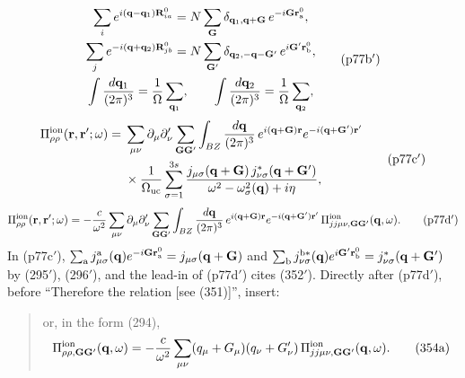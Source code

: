 \documentclass[11pt]{article}
\begin{document}
\begin{equation*}
\begin{gathered}
\sum_ie^{i(\mathbf q-\mathbf q_1)\mathbf R^0_{ia}}=N\sum_{\mathbf G}\delta_{\mathbf q_1,\mathbf q+\mathbf G}\,
e^{-i\mathbf G\mathbf r^0_{\rm a}},\\
\sum_je^{-i(\mathbf q+\mathbf q_2)\mathbf R^0_{jb}}=N\sum_{\mathbf G'}\delta_{\mathbf q_2,-\mathbf q-\mathbf G'}\,
e^{i\mathbf G'\mathbf r^0_{\rm b}},\\
\int\frac{d\mathbf q_1}{(2\pi)^3}=\frac1\Omega\sum_{\mathbf q_1},\qquad
\int\frac{d\mathbf q_2}{(2\pi)^3}=\frac1\Omega\sum_{\mathbf q_2},
\end{gathered}
\tag{p77b$'$}
\end{equation*}
\begin{equation*}
\begin{split}
\Pi^{\rm ion}_{\rho\rho}(\mathbf r,\mathbf r';\omega)={}&\sum_{\mu\nu}\partial_\mu\partial'_\nu
\sum_{\mathbf G\mathbf G'}\int_{BZ}\frac{d\mathbf q}{(2\pi)^3}\,
e^{i(\mathbf q+\mathbf G)\mathbf r}e^{-i(\mathbf q+\mathbf G')\mathbf r'}\\
&\times\frac{1}{\Omega_{\rm uc}}\sum_{\sigma=1}^{3s}
\frac{j_{\mu\sigma}(\mathbf q+\mathbf G)\,j^*_{\nu\sigma}(\mathbf q+\mathbf G')}{\omega^2-\omega^2_\sigma(\mathbf q)+i\eta},
\end{split}
\tag{p77c$'$}
\end{equation*}
\begin{equation*}
\Pi^{\rm ion}_{\rho\rho}(\mathbf r,\mathbf r';\omega)=-\frac{c}{\omega^2}\sum_{\mu\nu}\partial_\mu\partial'_\nu
\sum_{\mathbf G\mathbf G'}\int_{BZ}\frac{d\mathbf q}{(2\pi)^3}\,
e^{i(\mathbf q+\mathbf G)\mathbf r}e^{-i(\mathbf q+\mathbf G')\mathbf r'}\,
\Pi^{\rm ion}_{jj\mu\nu,\mathbf G\mathbf G'}(\mathbf q,\omega).\tag{p77d$'$}
\end{equation*}
In (p77c$'$), $\sum_{\rm a}j^{\rm a}_{\mu\sigma}(\mathbf q)e^{-i\mathbf G\mathbf r^0_{\rm a}}=j_{\mu\sigma}(\mathbf q+\mathbf G)$
and $\sum_{\rm b}j^{{\rm b}*}_{\nu\sigma}(\mathbf q)e^{i\mathbf G'\mathbf r^0_{\rm b}}=j^*_{\nu\sigma}(\mathbf q+\mathbf G')$
by (295$'$), (296$'$), and the lead-in of (p77d$'$) cites (352$'$). Directly after (p77d$'$), before
``Therefore the relation [see (351)]'', insert:
\begin{quote}
or, in the form (294),
\begin{equation*}
\Pi^{\rm ion}_{\rho\rho,\mathbf G\mathbf G'}(\mathbf q,\omega)=-\frac{c}{\omega^2}\sum_{\mu\nu}
(q_\mu+G_\mu)(q_\nu+G'_\nu)\,\Pi^{\rm ion}_{jj\mu\nu,\mathbf G\mathbf G'}(\mathbf q,\omega).\tag{354a}
\end{equation*}
\end{quote}
\end{document}
